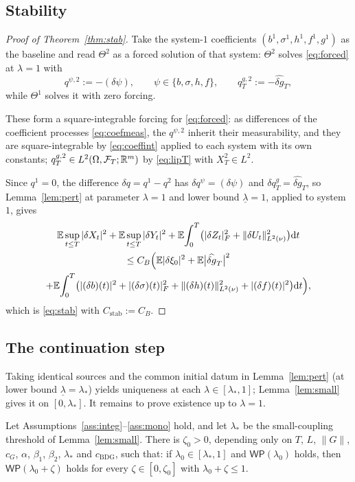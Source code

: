 \subsection{Stability}\label{sub:stabuniq}

\begin{proof}[Proof of Theorem~\ref{thm:stab}]
Take the system-$1$ coefficients $(b^1,\sigma^1,h^1,f^1,g^1)$ as the baseline and read
$\Theta^2$ as a forced solution of that system: $\Theta^2$ solves \eqref{eq:forced} at
$\lambda=1$ with
\[
q^{\psi,2}:=-(\delta\psi),\qquad \psi\in\{b,\sigma,h,f\},\qquad
q^{g,2}_T:=-\widehat{\delta g}_T ,
\]
while $\Theta^1$ solves it with zero forcing.

These form a square-integrable forcing for \eqref{eq:forced}: as differences of the
coefficient processes \eqref{eq:coefmeas}, the $q^{\psi,2}$ inherit their measurability,
and they are square-integrable by \eqref{eq:coeffint} applied to each system with its own
constants; $q^{g,2}_T\in L^2(\Omega,\mathcal{F}_T;\mathbb{R}^m)$ by \eqref{eq:lipT} with $X^2_T\in L^2$.

Since $q^1=0$, the difference $\delta q=q^1-q^2$ has $\delta q^\psi=(\delta\psi)$ and
$\delta q^g_T=\widehat{\delta g}_T$, so Lemma~\ref{lem:pert} at parameter $\lambda=1$ and
lower bound $\underline\lambda=1$, applied to
system~$1$, gives
\begin{multline*}
\mathbb{E}\sup_{t\le T}|\delta X_t|^2+\mathbb{E}\sup_{t\le T}|\delta Y_t|^2
+\mathbb{E}\!\int_0^T\!\big(|\delta Z_t|_F^2+\lVert \delta U_t\rVert_{L^2(\nu)}^2\big)\mathrm{d} t\\
\le C_B\Big(\mathbb{E}|\delta\xi_0|^2+\mathbb{E}\big|\widehat{\delta g}_T\big|^2\\
+\mathbb{E}\!\int_0^T\!\big(|(\delta b)(t)|^2+|(\delta\sigma)(t)|_F^2
+\lVert (\delta h)(t)\rVert_{L^2(\nu)}^2+|(\delta f)(t)|^2\big)\mathrm{d} t\Big),
\end{multline*}
which is \eqref{eq:stab} with $C_{\mathrm{stab}}:=C_B$.
\end{proof}

\subsection{The continuation step}

Taking identical sources and the common initial datum in Lemma~\ref{lem:pert} (at
lower bound $\underline\lambda=\lambda_*$) yields
uniqueness at each $\lambda\in[\lambda_*,1]$; Lemma~\ref{lem:small} gives it on
$[0,\lambda_*]$. It remains to prove existence up to $\lambda=1$.

\begin{lemma}[Continuation]\label{lem:cont}
Let Assumptions~\ref{ass:integ}--\ref{ass:mono} hold, and let $\lambda_*$ be the
small-coupling threshold of Lemma~\ref{lem:small}. There is $\zeta_0>0$, depending only on
$T$, $L$, $\|G\|$, $c_G$, $\alpha$, $\beta_1$, $\beta_2$, $\lambda_*$ and $c_{\mathrm{BDG}}$, such that: if
$\lambda_0\in[\lambda_*,1]$ and $\mathsf{WP}(\lambda_0)$ holds, then
$\mathsf{WP}(\lambda_0+\zeta)$ holds for every $\zeta\in[0,\zeta_0]$ with $\lambda_0+\zeta\le1$.
\end{lemma}

